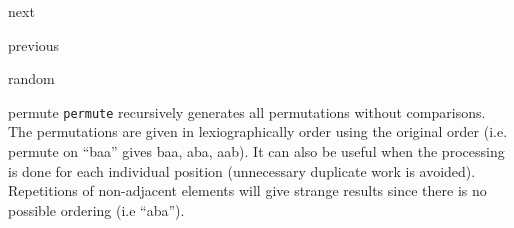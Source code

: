 \begin{algorithm}{next}
\end{algorithm}
\begin{algorithm}{previous}
\end{algorithm}
\begin{algorithm}{random}
\end{algorithm}
\begin{algorithm}{permute}
\desc
{\tt permute} recursively generates all permutations
without comparisons. The permutations are given in lexiographically order
using the original order (i.e. permute on ``baa'' gives baa, aba, aab).
It can also be useful when the processing is done for each individual
position (unnecessary duplicate work is avoided). Repetitions of non-adjacent
elements will give strange results since there is no possible ordering
(i.e ``aba'').
\end{algorithm}

\begin{sourceslandscape}
\end{sourceslandscape}
